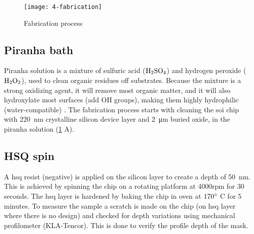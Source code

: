 \documentclass[../report.tex]{subfiles}
\begin{document}
\begin{figure}[H] %
	\centering
	\texttt{[image: 4-fabrication]}
	\caption{Fabrication process}
	\label{fig:4_fabrication}
\end{figure}


\subsection{Piranha bath}			
Piranha solution is a mixture of sulfuric acid ($\mathrm{H_2SO_4}$) and hydrogen peroxide ($\mathrm{H_2O_2}$), used to clean organic residues off substrates. Because the mixture is a strong oxidizing agent, it will remove most organic matter, and it will also hydroxylate most surfaces (add OH groups), making them highly hydrophilic (water-compatible) \cite{piranha_bath}. The fabrication process starts with cleaning the \gls{soi} chip with \SI{220}{\nano \meter} crystalline silicon device layer and \SI{2}{\micro \meter} buried oxide, in the piranha solution (\ref{fig:4_fabrication} A).
 
\subsection{HSQ spin}
A \gls{hsq} resist (negative) is applied on the silicon layer to create a depth of \SI{50}{\nano \meter}. This is achieved by spinning the chip on a  rotating platform at 4000rpm for 30 seconds. The \gls{hsq} layer is hardened by baking the chip in oven at $\mathrm{170^{\circ}}$ C for 5 minutes. To measure the sample a scratch is made on the chip (on \gls{hsq} layer where there is no design) and checked for depth variations using mechanical profilometer (KLA-Tencor). This is done to verify the profile depth of the mask.
\end{document}
